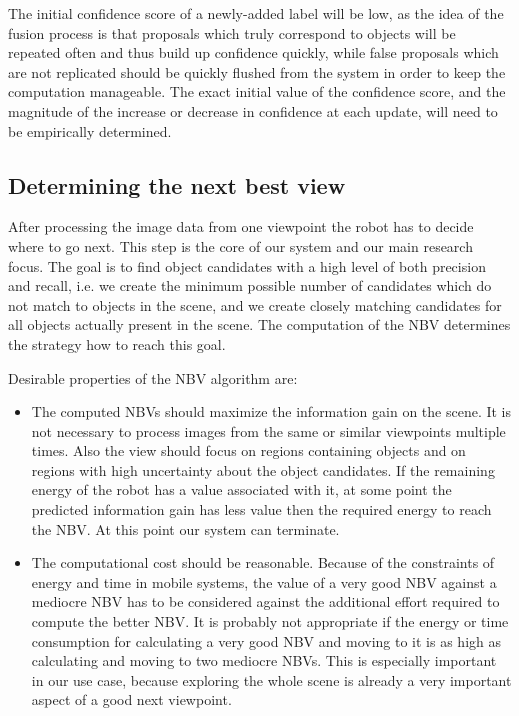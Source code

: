 \documentclass[a4paper,11pt,english]{article}
\begin{document}
The initial confidence score of a newly-added label will be low, as the idea of the fusion process is that proposals which truly correspond to objects will be repeated often and thus build up confidence quickly, while false proposals which are not replicated should be quickly flushed from the system in order to keep the computation manageable.
The exact initial value of the confidence score, and the magnitude of the increase or decrease in confidence at each update, will need to be empirically determined.

\subsection{Determining the next best view}
\label{system:nbv}
After processing the image data from one viewpoint the robot has to decide where to go next.
This step is the core of our system and our main research focus.
The goal is to find object candidates with a high level of both precision and recall, i.e. we create the minimum possible number of candidates which do not match to objects in the scene, and we create closely matching candidates for all objects actually present in the scene.
The computation of the NBV determines the strategy how to reach this goal.

Desirable properties of the NBV algorithm are:
\begin{itemize}
	\item The computed NBVs should maximize the information gain on the scene.
	It is not necessary to process images from the same or similar viewpoints multiple times.
	Also the view should focus on regions containing objects and on regions with high uncertainty about the object candidates.
	If the remaining energy of the robot has a value associated with it, at some point the predicted information gain has less value then the required energy to reach the NBV.
	At this point our system can terminate.
	\item The computational cost should be reasonable.
	Because of the constraints of energy and time in mobile systems, the value of a very good NBV against a mediocre NBV has to be considered against the additional effort required to compute the better NBV.
	It is probably not appropriate if the energy or time consumption for calculating a very good NBV and moving to it is as high as calculating and moving to two mediocre NBVs.
	This is especially important in our use case, because exploring the whole scene is already a very important aspect of a good next viewpoint.
\end{itemize}
\end{document}
